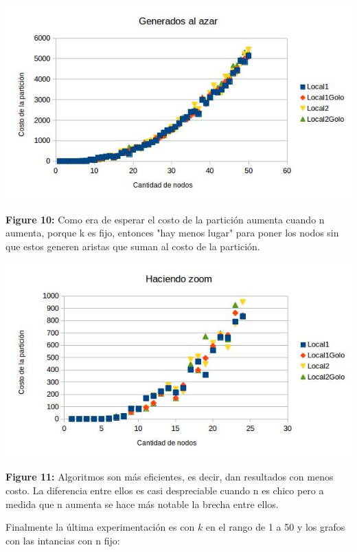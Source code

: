 \documentclass[a4paper]{article}
\begin{document}
\includegraphics[width=\textwidth,height=\textheight,keepaspectratio
]{k3n1-50Suma.jpg}
\begin {flushleft}
\textbf{Figure 10:} Como era de esperar el costo de la partición aumenta cuando n aumenta, porque k es fijo, entonces "hay menos lugar" para poner los nodos sin que estos generen aristas que suman al costo de la partición.
\end{flushleft}

\includegraphics[width=\textwidth,height=\textheight,keepaspectratio
]{k3n1-50SumaZoom.jpg}
\begin {flushleft}
\textbf{Figure 11:} Algoritmos son más eficientes, es decir, dan resultados con menos costo. La diferencia entre ellos es casi despreciable cuando n es chico pero a medida que n aumenta se hace más notable la brecha entre ellos.
\end{flushleft}

Finalmente la última experimentación es con $k$ en el rango de 1 a 50 y los grafos con las intancias con n fijo:\newline
\end{document}
